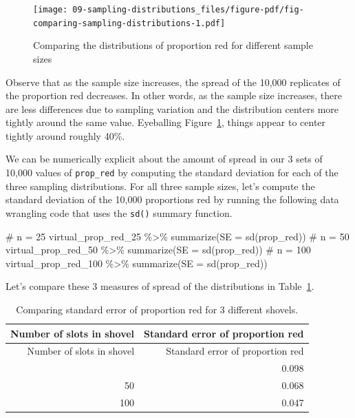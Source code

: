 \documentclass[
  letterpaper,
  DIV=11,
  numbers=noendperiod]{scrreprt}
\newenvironment{Shaded}{\begin{snugshade}}{\end{snugshade}}
\newcommand{\AttributeTok}[1]{\textcolor[rgb]{0.40,0.45,0.13}{#1}}
\newcommand{\CommentTok}[1]{\textcolor[rgb]{0.37,0.37,0.37}{#1}}
\newcommand{\FunctionTok}[1]{\textcolor[rgb]{0.28,0.35,0.67}{#1}}
\newcommand{\NormalTok}[1]{\textcolor[rgb]{0.00,0.23,0.31}{#1}}
\newcommand{\SpecialCharTok}[1]{\textcolor[rgb]{0.37,0.37,0.37}{#1}}
\theoremstyle{definition}
\theoremstyle{remark}
\begin{document}
\begin{figure}

{\centering \texttt{[image: 09-sampling-distributions\_files/figure-pdf/fig-comparing-sampling-distributions-1.pdf]}

}

\caption{\label{fig-comparing-sampling-distributions}Comparing the
distributions of proportion red for different sample sizes}

\end{figure}

Observe that as the sample size increases, the spread of the 10,000
replicates of the proportion red decreases. In other words, as the
sample size increases, there are less differences due to sampling
variation and the distribution centers more tightly around the same
value. Eyeballing Figure~\ref{fig-comparing-sampling-distributions},
things appear to center tightly around roughly 40\%.

We can be numerically explicit about the amount of spread in our 3 sets
of 10,000 values of \texttt{prop\_red} by computing the standard
deviation for each of the three sampling distributions. For all three
sample sizes, let's compute the standard deviation of the 10,000
proportions red by running the following data wrangling code that uses
the \texttt{sd()} summary function.

\begin{Shaded}
\begin{Highlighting}[]
\CommentTok{\# n = 25}
\NormalTok{virtual\_prop\_red\_25 }\SpecialCharTok{\%\textgreater{}\%} 
  \FunctionTok{summarize}\NormalTok{(}\AttributeTok{SE =} \FunctionTok{sd}\NormalTok{(prop\_red))}
\CommentTok{\# n = 50}
\NormalTok{virtual\_prop\_red\_50 }\SpecialCharTok{\%\textgreater{}\%} 
  \FunctionTok{summarize}\NormalTok{(}\AttributeTok{SE =} \FunctionTok{sd}\NormalTok{(prop\_red))}
\CommentTok{\# n = 100}
\NormalTok{virtual\_prop\_red\_100 }\SpecialCharTok{\%\textgreater{}\%} 
  \FunctionTok{summarize}\NormalTok{(}\AttributeTok{SE =} \FunctionTok{sd}\NormalTok{(prop\_red))}
\end{Highlighting}
\end{Shaded}

Let's compare these 3 measures of spread of the distributions in
Table~\ref{tbl-comparing-n}.

\hypertarget{tbl-comparing-n}{}
\begin{longtable}[]{@{}rr@{}}
\caption{\label{tbl-comparing-n}Comparing standard error of proportion
red for 3 different shovels.}\tabularnewline
\toprule\noalign{}
Number of slots in shovel & Standard error of proportion red \\
\midrule\noalign{}
\endfirsthead
\toprule\noalign{}
Number of slots in shovel & Standard error of proportion red \\
\midrule\noalign{}
\endhead
\bottomrule\noalign{}
\endlastfoot
25 & 0.098 \\
50 & 0.068 \\
100 & 0.047 \\
\end{longtable}
\end{document}

